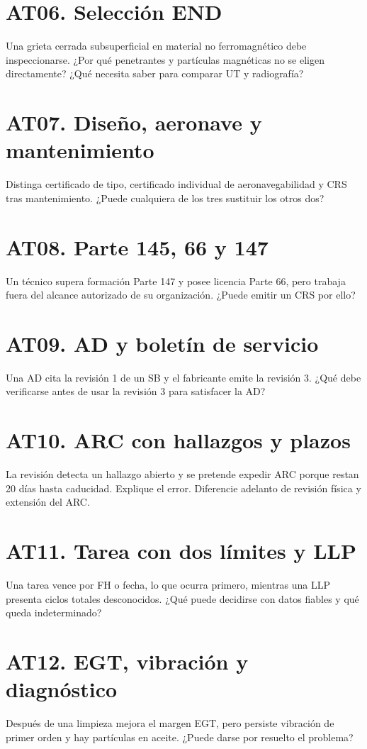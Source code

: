 \section*{AT06. Selección END}
Una grieta cerrada subsuperficial en material no ferromagnético debe inspeccionarse. ¿Por qué penetrantes y partículas magnéticas no se eligen directamente? ¿Qué necesita saber para comparar UT y radiografía?

\section*{AT07. Diseño, aeronave y mantenimiento}
Distinga certificado de tipo, certificado individual de aeronavegabilidad y CRS tras mantenimiento. ¿Puede cualquiera de los tres sustituir los otros dos?

\section*{AT08. Parte 145, 66 y 147}
Un técnico supera formación Parte 147 y posee licencia Parte 66, pero trabaja fuera del alcance autorizado de su organización. ¿Puede emitir un CRS por ello?

\section*{AT09. AD y boletín de servicio}
Una AD cita la revisión 1 de un SB y el fabricante emite la revisión 3. ¿Qué debe verificarse antes de usar la revisión 3 para satisfacer la AD?

\section*{AT10. ARC con hallazgos y plazos}
La revisión detecta un hallazgo abierto y se pretende expedir ARC porque restan 20 días hasta caducidad. Explique el error. Diferencie adelanto de revisión física y extensión del ARC.

\section*{AT11. Tarea con dos límites y LLP}
Una tarea vence por FH o fecha, lo que ocurra primero, mientras una LLP presenta ciclos totales desconocidos. ¿Qué puede decidirse con datos fiables y qué queda indeterminado?

\section*{AT12. EGT, vibración y diagnóstico}
Después de una limpieza mejora el margen EGT, pero persiste vibración de primer orden y hay partículas en aceite. ¿Puede darse por resuelto el problema?
